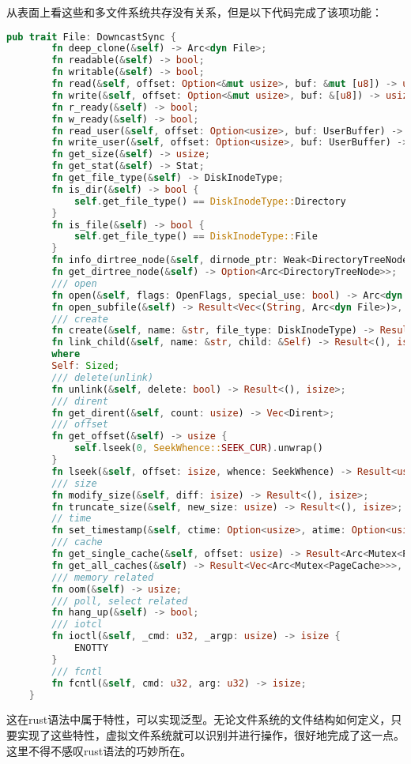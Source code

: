 从表面上看这些和多文件系统共存没有关系，但是以下代码完成了该项功能：
\begin{lstlisting}[language={Rust}, label={file-trait},
	caption={file\_trait}]
	pub trait File: DowncastSync {
		fn deep_clone(&self) -> Arc<dyn File>;
		fn readable(&self) -> bool;
		fn writable(&self) -> bool;
		fn read(&self, offset: Option<&mut usize>, buf: &mut [u8]) -> usize;
		fn write(&self, offset: Option<&mut usize>, buf: &[u8]) -> usize;
		fn r_ready(&self) -> bool;
		fn w_ready(&self) -> bool;
		fn read_user(&self, offset: Option<usize>, buf: UserBuffer) -> usize;
		fn write_user(&self, offset: Option<usize>, buf: UserBuffer) -> usize;
		fn get_size(&self) -> usize;
		fn get_stat(&self) -> Stat;
		fn get_file_type(&self) -> DiskInodeType;
		fn is_dir(&self) -> bool {
			self.get_file_type() == DiskInodeType::Directory
		}
		fn is_file(&self) -> bool {
			self.get_file_type() == DiskInodeType::File
		}
		fn info_dirtree_node(&self, dirnode_ptr: Weak<DirectoryTreeNode>);
		fn get_dirtree_node(&self) -> Option<Arc<DirectoryTreeNode>>;
		/// open
		fn open(&self, flags: OpenFlags, special_use: bool) -> Arc<dyn File>;
		fn open_subfile(&self) -> Result<Vec<(String, Arc<dyn File>)>, isize>;
		/// create
		fn create(&self, name: &str, file_type: DiskInodeType) -> Result<Arc<dyn File>, isize>;
		fn link_child(&self, name: &str, child: &Self) -> Result<(), isize>
		where
		Self: Sized;
		/// delete(unlink)
		fn unlink(&self, delete: bool) -> Result<(), isize>;
		/// dirent
		fn get_dirent(&self, count: usize) -> Vec<Dirent>;
		/// offset
		fn get_offset(&self) -> usize {
			self.lseek(0, SeekWhence::SEEK_CUR).unwrap()
		}
		fn lseek(&self, offset: isize, whence: SeekWhence) -> Result<usize, isize>;
		/// size
		fn modify_size(&self, diff: isize) -> Result<(), isize>;
		fn truncate_size(&self, new_size: usize) -> Result<(), isize>;
		// time
		fn set_timestamp(&self, ctime: Option<usize>, atime: Option<usize>, mtime: Option<usize>);
		/// cache
		fn get_single_cache(&self, offset: usize) -> Result<Arc<Mutex<PageCache>>, ()>;
		fn get_all_caches(&self) -> Result<Vec<Arc<Mutex<PageCache>>>, ()>;
		/// memory related
		fn oom(&self) -> usize;
		/// poll, select related
		fn hang_up(&self) -> bool;
		/// iotcl
		fn ioctl(&self, _cmd: u32, _argp: usize) -> isize {
			ENOTTY
		}
		/// fcntl
		fn fcntl(&self, cmd: u32, arg: u32) -> isize;
	}
\end{lstlisting}

这在rust语法中属于特性，可以实现泛型。无论文件系统的文件结构如何定义，只要实现了这些特性，虚拟文件系统就可以识别并进行操作，很好地完成了这一点。这里不得不感叹rust语法的巧妙所在。

